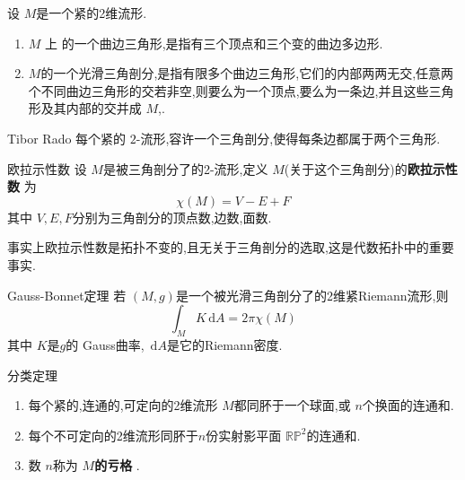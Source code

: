 \documentclass[../../几何与拓扑.tex]{subfiles}
\begin{document}
\begin{definition}
    设 \(  M  \)是一个紧的2维流形.
    \begin{enumerate}
        \item  \textbf{\(  M  \) }上 的一个曲边三角形,是指有三个顶点和三个变的曲边多边形.
        \item \(  M  \)的一个光滑三角剖分,是指有限多个曲边三角形,它们的内部两两无交,任意两个不同曲边三角形的交若非空,则要么为一个顶点,要么为一条边,并且这些三角形及其内部的交并成  \(  M  \),. 
    \end{enumerate}
     
\end{definition}

\begin{theorem}{Tibor Rado}
    每个紧的 \(  2  \)-流形,容许一个三角剖分,使得每条边都属于两个三角形. 
\end{theorem}


\begin{definition}{欧拉示性数}
    设 \(  M  \)是被三角剖分了的2-流形,定义 \(  M  \)(关于这个三角剖分)的\textbf{欧拉示性数}  为 \[
    \chi \left( M \right)= V-E+ F 
    \]其中 \(  V,E,F  \)分别为三角剖分的顶点数,边数,面数. 
\end{definition}

\begin{remark}
    事实上欧拉示性数是拓扑不变的,且无关于三角剖分的选取,这是代数拓扑中的重要事实.
\end{remark}

\begin{theorem}{Gauss-Bonnet定理}
    若 \(  \left( M,g \right)   \)是一个被光滑三角剖分了的2维紧Riemann流形,则 \[
    \int_{M}K\,\mathrm{d} A= 2\pi \chi \left( M \right) 
    \]其中 \(  K  \)是\(  g  \)的 Gauss曲率, \(  \,\mathrm{d} A  \)是它的Riemann密度.  
\end{theorem}

\begin{theorem}{分类定理}
    \begin{enumerate}
        \item  每个紧的,连通的,可定向的2维流形 \(  M  \)都同肧于一个球面,或 \(  n  \)个换面的连通和.
        \item     每个不可定向的2维流形同肧于\(  n  \)份实射影平面 \(  \mathbb{R} \mathbb{P}^{2}  \)的连通和.  
        \item 数 \(  n  \)称为 \textbf{\(  M  \)的亏格 }. 
       \end{enumerate}
\end{theorem}
\end{document}
